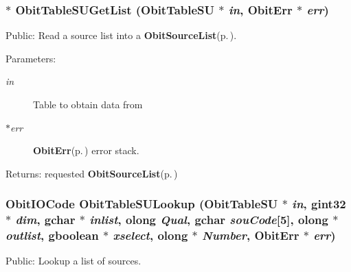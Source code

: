 \subsubsection{$\ast$ Obit\-Table\-SUGet\-List ({\bf Obit\-Table\-SU} $\ast$ {\em in}, {\bf Obit\-Err} $\ast$ {\em err})}\label{ObitTableSUUtil_8h_a1}


Public: Read a source list into a {\bf Obit\-Source\-List}{\rm (p.\,\pageref{structObitSourceList})}. 

\begin{Desc}
\item[Parameters:]
\begin{description}
\item[{\em in}]Table to obtain data from \item[{\em $\ast$err}]{\bf Obit\-Err}{\rm (p.\,\pageref{structObitErr})} error stack. \end{description}
\end{Desc}
\begin{Desc}
\item[Returns:]requested {\bf Obit\-Source\-List}{\rm (p.\,\pageref{structObitSourceList})} \end{Desc}
\subsubsection{\setlength{\rightskip}{0pt plus 5cm}Obit\-IOCode Obit\-Table\-SULookup ({\bf Obit\-Table\-SU} $\ast$ {\em in}, gint32 $\ast$ {\em dim}, gchar $\ast$ {\em inlist}, {\bf olong} {\em Qual}, gchar {\em sou\-Code}[5], {\bf olong} $\ast$ {\em outlist}, gboolean $\ast$ {\em xselect}, {\bf olong} $\ast$ {\em Number}, {\bf Obit\-Err} $\ast$ {\em err})}\label{ObitTableSUUtil_8h_a0}


Public: Lookup a list of sources. 

